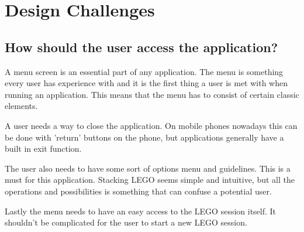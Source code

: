 
\section{Design Challenges}
\subsection{How should the user access the application?}
A menu screen is an essential part of any application. The menu is something every user has experience with and it is the first thing a user is met with when running an application. This means that the menu has to consist of certain classic elements.\par A user needs a way to close the application. On mobile phones nowadays this can be done with 'return' buttons on the phone, but applications generally have a built in exit function.\par
The user also needs to have some sort of options menu and guidelines. This is a must for this application. Stacking LEGO seems simple and intuitive, but all the operations and possibilities is something that can confuse a potential user. \par
Lastly the menu needs to have an easy access to the LEGO session itself. It shouldn't be complicated for the user to start a new LEGO session. 
